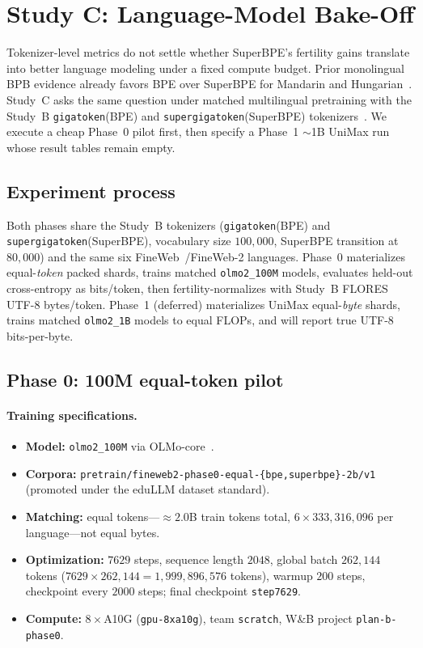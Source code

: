 \documentclass[11pt,a4paper]{article}
\begin{document}
\section{Study C: Language-Model Bake-Off}
\label{sec:study-c}
\label{sec:deferred}

Tokenizer-level metrics do not settle whether SuperBPE's fertility gains translate into better language modeling under a fixed compute budget.
Prior monolingual BPB evidence already favors BPE over SuperBPE for Mandarin and Hungarian~\citep{chowdhury-woolf-2026-benchmarking}.
Study~C asks the same question under matched multilingual pretraining with the Study~B \texttt{gigatoken}(BPE) and \texttt{supergigatoken}(SuperBPE) tokenizers~\citep{roed2026gigatoken,verma2026supergigatoken}.
We execute a cheap Phase~0 pilot first, then specify a Phase~1 $\sim$1B UniMax run whose result tables remain empty.

\subsection{Experiment process}

Both phases share the Study~B tokenizers (\texttt{gigatoken}(BPE) and \texttt{supergigatoken}(SuperBPE), vocabulary size $100{,}000$, SuperBPE transition at $80{,}000$) and the same six FineWeb~/FineWeb-2 languages.
Phase~0 materializes equal-\emph{token} packed shards, trains matched \texttt{olmo2\_100M} models, evaluates held-out cross-entropy as bits/token, then fertility-normalizes with Study~B FLORES UTF-8 bytes/token.
Phase~1 (deferred) materializes UniMax equal-\emph{byte} shards, trains matched \texttt{olmo2\_1B} models to equal FLOPs, and will report true UTF-8 bits-per-byte.

\subsection{Phase 0: 100M equal-token pilot}
\label{sec:phase0}

\paragraph{Training specifications.}
\begin{itemize}[leftmargin=*,itemsep=2pt]
  \item \textbf{Model:} \texttt{olmo2\_100M} via OLMo-core~\citep{olmo2025}.
  \item \textbf{Corpora:} \texttt{pretrain/fineweb2-phase0-equal-\{bpe,superbpe\}-2b/v1} (promoted under the eduLLM dataset standard).
  \item \textbf{Matching:} equal tokens---$\approx 2.0$B train tokens total, $6\times 333{,}316{,}096$ per language---not equal bytes.
  \item \textbf{Optimization:} $7629$ steps, sequence length $2048$, global batch $262{,}144$ tokens ($7629\times 262{,}144 = 1{,}999{,}896{,}576$ tokens), warmup $200$ steps, checkpoint every $2000$ steps; final checkpoint \texttt{step7629}.
  \item \textbf{Compute:} $8\times$A10G (\texttt{gpu-8xa10g}), team \texttt{scratch}, W\&B project \texttt{plan-b-phase0}.
\end{itemize}
\end{document}
